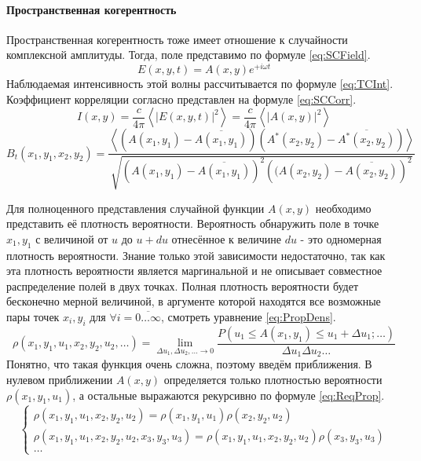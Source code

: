 \paragraph{Пространственная когерентность}\label{par:SpatialIncoherence}
Пространственная когерентность тоже имеет отношение к случайности комплексной амплитуды. Тогда, поле представимо по формуле \ref{eq:SCField}.
\begin{equation}\label{eq:SCField}
	E(x,y,t) = A(x,y)e^{+i{\omega}t}
\end{equation}
Наблюдаемая интенсивность этой волны рассчитывается по формуле \ref{eq:TCInt}. Коэффициент корреляции согласно \cite{Ahmanov} представлен на формуле \ref{eq:SCCorr}.
\begin{equation}\label{eq:TCInt}
	I(x,y) = \frac{c}{4\pi}\left<\left|E(x,y,t)\right|^2\right> = \frac{c}{4\pi}\left<\left|A(x,y)\right|^2\right>
\end{equation}
\begin{equation}\label{eq:SCCorr}
	B_t(x_1,y_1,x_2,y_2)=\frac
	{\left<\left(A(x_1,y_1) - \overline{A(x_1,y_1)}\right)\left(A^*(x_2,y_2) - \overline{A^*(x_2,y_2)}\right)\right>}
	{\sqrt{\left(A(x_1,y_1) - \overline{A(x_1,y_1)}\right)^2\left((A(x_2,y_2) - \overline{A(x_2,y_2)}\right)^2}}
\end{equation}
\par
Для полноценного представления случайной функции $A(x,y)$ необходимо представить её плотность вероятности. Вероятность обнаружить поле в точке $x_1,y_1$ с величиной от $u$ до $u+du$ отнесённое к величине $du$ - это одномерная плотность вероятности. Знание только этой зависимости недостаточно, так как эта плотность вероятности является маргинальной и не описывает совместное распределение полей в двух точках. Полная плотность вероятности будет бесконечно мерной величиной, в аргументе которой находятся все возможные пары точек $x_i,y_i$ для $\forall i = \overline{0 \dots \infty}$, смотреть уравнение \ref{eq:PropDens}.
\begin{equation}\label{eq:PropDens}
	\rho(x_1,y_1,u_1,x_2,y_2,u_2,\dots) = \lim\limits_{\Delta u_1, \Delta u_2, \dots \rightarrow 0}\frac
	{P\left(u_1 \le A(x_1,y_1) \le u_1 + \Delta u_1; \dots\right)}
	{\Delta u_1 \Delta u_2 \dots}
\end{equation}
Понятно, что такая функция очень сложна, поэтому введём приближения. В нулевом приближении $A(x,y)$ определяется только плотностью вероятности $\rho(x_1,y_1,u_1)$, а остальные выражаются рекурсивно по формуле \ref{eq:ReqProp}.
\begin{equation}\label{eq:ReqProp}
	\begin{cases}
		\rho(x_1,y_1,u_1,x_2,y_2,u_2) = \rho(x_1,y_1,u_1) \rho(x_2,y_2,u_2) \\
		\rho(x_1,y_1,u_1,x_2,y_2,u_2,x_3,y_3,u_3) =  \rho(x_1,y_1,u_1,x_2,y_2,u_2) \rho(x_3,y_3,u_3) \\
		\dots
	\end{cases}
\end{equation}
